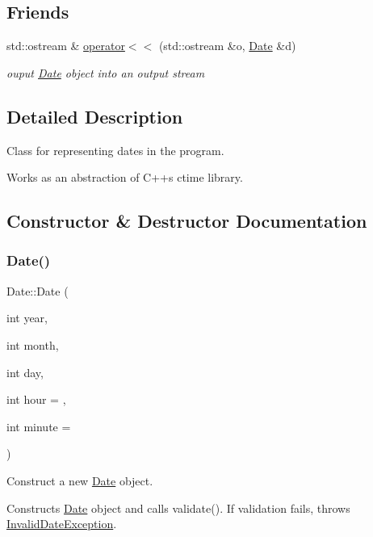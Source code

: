 \subsection*{Friends}
\begin{DoxyCompactItemize}
\item 
std\+::ostream \& \mbox{\hyperlink{classDate_a2f114c7aa1398dac0f21b888bcb40f3e}{operator$<$$<$}} (std\+::ostream \&o, \mbox{\hyperlink{classDate}{Date}} \&d)
\begin{DoxyCompactList}\small\item\em ouput \mbox{\hyperlink{classDate}{Date}} object into an output stream \end{DoxyCompactList}\end{DoxyCompactItemize}


\subsection{Detailed Description}
Class for representing dates in the program. 

Works as an abstraction of C++\textquotesingle{}s ctime library. 

\subsection{Constructor \& Destructor Documentation}
\mbox{\label{classDate_aa29ee0f04162437b91b758be0a4b75fc}} 
\subsubsection{\texorpdfstring{Date()}{Date()}\hspace{0.1cm}{\footnotesize\ttfamily [1/2]}}
{\footnotesize\ttfamily Date\+::\+Date (\begin{DoxyParamCaption}\item[{int}]{year,  }\item[{int}]{month,  }\item[{int}]{day,  }\item[{int}]{hour = {},  }\item[{int}]{minute = {} }\end{DoxyParamCaption})}



Construct a new \mbox{\hyperlink{classDate}{Date}} object. 

Constructs \mbox{\hyperlink{classDate}{Date}} object and calls validate(). If validation fails, throws \mbox{\hyperlink{classInvalidDateException}{Invalid\+Date\+Exception}}.


